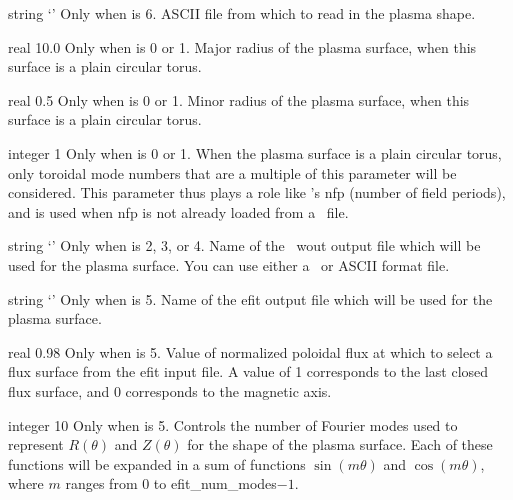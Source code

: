 \myhrule

{string}
{`'}
{Only when  is 6.}
{ASCII file from which to read in the plasma shape.}

\myhrule

{real}
{10.0}
{Only when  is 0 or 1.}
{Major radius of the plasma surface, when this surface is a plain circular torus.}

\myhrule

{real}
{0.5}
{Only when  is 0 or 1.}
{Minor radius of the plasma surface, when this surface is a plain circular torus.}

\myhrule

{integer}
{1}
{Only when  is 0 or 1.}
{When the plasma surface is a plain circular torus, only toroidal mode numbers that are a multiple of this parameter will be considered.
This parameter thus plays a role like \vmec's {\ttfamily nfp} (number of field periods),
and is used when {\ttfamily nfp} is not already loaded from a \vmec~file.}

\myhrule

{string}
{`'}
{Only when  is 2, 3, or 4.}
{Name of the \vmec~{\ttfamily wout} output file which will be used for the plasma surface.
You can use either a \netCDF~or {\ttfamily ASCII} format file.}

\myhrule

{string}
{`'}
{Only when  is 5.}
{Name of the {\ttfamily efit} output file which will be used for the plasma surface.}

\myhrule

{real}
{0.98}
{Only when  is 5.}
{Value of normalized poloidal flux at which to select a flux surface from the {\ttfamily efit} input file.
A value of 1 corresponds to the last closed flux surface, and 0 corresponds to the magnetic axis.}

\myhrule

{integer}
{10}
{Only when  is 5.}
{Controls the number of Fourier modes used to represent $R(\theta)$ and $Z(\theta)$ for the shape of
the plasma surface. Each of these functions will be expanded in a sum of functions $\sin(m\theta)$ and $\cos(m\theta)$,
where $m$ ranges from 0 to {\ttfamily efit\_num\_modes}$-1$.}

